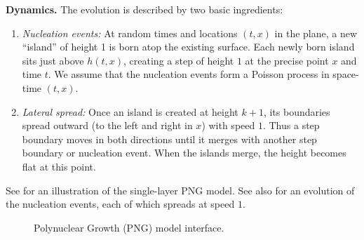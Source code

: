 \documentclass[letterpaper,11pt,oneside,reqno]{article}
\numberwithin{equation}{section}
\theoremstyle{definition}
\begin{document}
\smallskip

\noindent\textbf{Dynamics.} The evolution is described by two basic ingredients:
\begin{enumerate}
\item \emph{Nucleation events:} At random times and locations $(t,x)$ in the plane, a new ``island'' of height 1 is born atop the existing surface. Each newly born island sits just above $h(t,x)$, creating a step of height $1$ at the precise point $x$ and time $t$.
	We assume that the nucleation events form a Poisson process in space-time $(t,x)$.
\item \emph{Lateral spread:} Once an island is created at height $k+1$, its boundaries spread outward (to the left and right in $x$) with speed $1$. Thus a step boundary moves in both directions until it merges with another step boundary or nucleation event.
	When the islands merge, the height becomes flat at this point.
\end{enumerate}
See  for an illustration of the single-layer PNG model.
See also 
for an evolution
of the nucleation events, each of which
spreads at speed $1$.

\begin{figure}[htb]
 \centering
 \caption{Polynuclear Growth (PNG) model interface.}
 \label{fig:PNG}
\end{figure}
\end{document}
